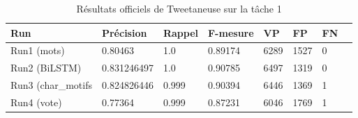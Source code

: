 \begin{table}
\begin{tabular}{l|l|l|l|l|l|l|l}
Run		& Précision	& Rappel& F-mesure	& VP 	&FP 	&FN\\
\hline
\hline
\hline
Run1 (mots)  	&0.80463   	& 1.0	& 0.89174 	&6289	&1527	&0\\
Run2 (BiLSTM)	& 0.831246497 	& 1.0	& 0.90785	&6497	&1319	&0\\
Run3 (char\_motifs&0.824826446  & 0.999	& 0.90394	&6446	&1369	&1\\
Run4 (vote)	&0.77364	& 0.999 & 0.87231	&6046	&1769	&1\\
\hline

\end{tabular}
\caption{Résultats officiels de Tweetaneuse sur la tâche 1}
\end{table}
